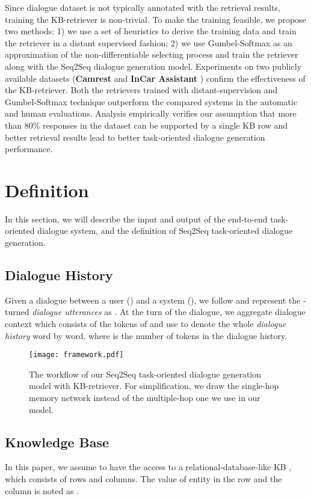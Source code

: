 \documentclass[11pt,a4paper]{article}
\begin{document}
Since dialogue dataset is not typically annotated with the retrieval results, 
training the KB-retriever is non-trivial.
To make the training feasible, we
propose two methods:
1) we use a set of heuristics to derive the training data
and train the retriever in a distant supervised fashion;
2) we use Gumbel-Softmax \cite{45822} 
as an approximation of the non-differentiable selecting process
and train the retriever along with 
the Seq2Seq dialogue generation model. 
Experiments on two publicly available datasets ({\bf{Camrest}} \cite{wen:2017:EACL} and {\bf{InCar Assistant}} \cite{eric:2017:SIGDial}) 
confirm
the effectiveness of the KB-retriever.
Both the retrievers
trained with distant-supervision and Gumbel-Softmax technique outperform
the compared systems
in the automatic and human evaluations. 
Analysis empirically verifies our assumption
that more than 80\% responses
in the dataset can be supported by a single KB row
and better retrieval results lead to better task-oriented dialogue generation performance.

\section{Definition}
In this section,
we will describe the input and output of the end-to-end task-oriented dialogue system,
and the definition of Seq2Seq task-oriented dialogue generation.

\subsection{Dialogue History}
Given a dialogue between a user () and a system (),
we follow  and
represent the -turned \textit{dialogue utterances} as 
.
At the  turn of the dialogue, we aggregate dialogue context
which consists of the tokens of  and use  
to denote the whole \textit{dialogue history} word by word,
where  is the number of tokens in the dialogue history.
\begin{figure*}[t]
	\centering
\texttt{[image: framework.pdf]}
	\caption{
		The workflow of our Seq2Seq task-oriented dialogue generation model with KB-retriever.
		For simplification, we draw the single-hop memory network instead of the multiple-hop one we use in our model.
	}
	\label{fig:framework}
\end{figure*}

\subsection{Knowledge Base}
In this paper, we assume to 
have the 
access 
to a relational-database-like 
KB  ,
which consists of  rows and  columns.
The value of entity in the  row and the  column is noted as .
\end{document}

